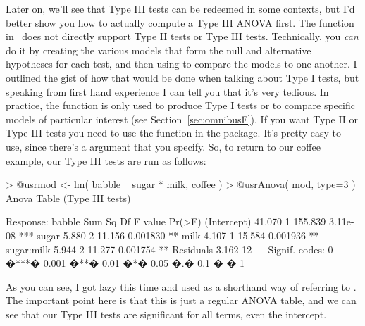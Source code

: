 Later on, we'll see that Type III tests can be redeemed in some contexts, but I'd better show you how to actually compute a Type III ANOVA first. The  function in \R\ does not directly support Type II tests or Type III tests. Technically, you {\it can} do it by creating the various models that form the null and alternative hypotheses for each test, and then using  to compare the models to one another. I outlined the gist of how that would be done when talking about Type I tests, but speaking from first hand experience I can tell you that it's very tedious. In practice, the  function is only used to produce Type I tests or to compare specific models of particular interest (see Section~\ref{sec:omnibusF}). If you want Type II or Type III tests you need to use the  function in the  package. It's pretty easy to use, since there's a  argument that you specify. So, to return to our coffee example, our Type III tests are run as follows:
\begin{rblock1}
> @usr{mod <- lm( babble ~ sugar * milk, coffee )}
> @usr{Anova( mod, type=3 )}
Anova Table (Type III tests)

Response: babble
            Sum Sq Df F value   Pr(>F)    
(Intercept) 41.070  1 155.839 3.11e-08 ***
sugar        5.880  2  11.156 0.001830 ** 
milk         4.107  1  15.584 0.001936 ** 
sugar:milk   5.944  2  11.277 0.001754 ** 
Residuals    3.162 12                     
---
Signif. codes:  0 �***� 0.001 �**� 0.01 �*� 0.05 �.� 0.1 � � 1 
\end{rblock1}
As you can see, I got lazy this time and used  as a shorthand way of referring to . The important point here is that this is just a regular ANOVA table, and we can see that our Type III tests are significant for all terms, even the intercept.

